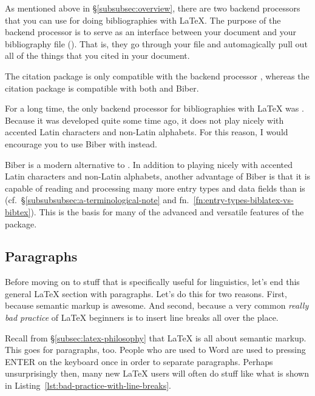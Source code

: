 As mentioned above in \S\ref{subsubsec:overview}, there are two backend processors that you can use for doing bibliographies with \LaTeX.
The purpose of the backend processor is to serve as an interface between your  document and your bibliography file ().
That is, they go through your  file and automagically pull out all of the things that you cited in your  document.

The citation package  is only compatible with the backend processor , whereas the citation package  is compatible with both  and Biber.

\label{subsubsubsec:bibtex}

For a long time, the only backend processor for bibliographies with \LaTeX{} was .
Because it was developed quite some time ago, it does not play nicely with accented Latin characters and non-Latin alphabets.
For this reason, I would encourage you to use Biber with  instead.

\label{subsubsubsec:biber}

Biber is a modern alternative to .
In addition to playing nicely with accented Latin characters and non-Latin alphabets, another advantage of Biber is that it is capable of reading and processing many more entry types and data fields than  is (cf.~\S\ref{subsubsubsec:a-terminological-note} and fn.~\ref{fn:entry-types-biblatex-vs-bibtex}).
This is the basis for many of the advanced and versatile features of the  package.

\subsection{Paragraphs}
\label{subsec:paragraphs}

Before moving on to stuff that is specifically useful for linguistics, let's end this general \LaTeX{} section with paragraphs.
Let's do this for two reasons.
First, because semantic markup is awesome.
And second, because a very common \emph{really bad practice} of \LaTeX{} beginners is to insert line breaks all over the place.

Recall from \S\ref{subsec:latex-philosophy} that \LaTeX{} is all about semantic markup.
This goes for paragraphs, too.
People who are used to Word are used to pressing ENTER on the keyboard once in order to separate paragraphs.
Perhaps unsurprisingly then, many new \LaTeX{} users will often do stuff like what is shown in Listing~\ref{lst:bad-practice-with-line-breaks}.

